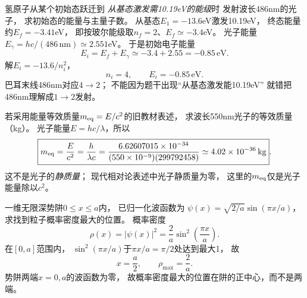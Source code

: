 \problemtext 氢原子从某个初始态跃迁到
\emph{从基态激发需10.19eV的能级}时
发射波长486nm的光子，
求初始态的能量与主量子数。
\workings
从基态$E_1=-13.6$eV激发10.19eV，
终态能量约$E_f=-3.41$eV，
即按玻尔能级取$n_f=2$、$E_f\simeq-3.4$eV。
光子能量
$E_\gamma=hc/(486\,\mathrm{nm})\simeq2.551$eV。
于是初始电子能量
\[
E_i=E_f+E_\gamma\simeq-3.4+2.55
=-0.85\,\mathrm{eV}.
\]
解$E_i=-13.6/n_i^2$，
\[
\boxed{n_i=4},\qquad
\boxed{E_i=-0.85\,\mathrm{eV}}.
\]
\crosscheck 巴耳末线486nm对应$4\to2$；
不能因为题干出现“从基态激发能10.19eV”
就错把486nm理解成$1\to2$发射。

\problemtext 若采用能量等效质量$m_{\rm eq}=E/c^2$的旧教材表述，
求波长550nm光子的等效质量（kg）。
\workings
光子能量$E=hc/\lambda$，所以
\[
\boxed{m_{\rm eq}=\frac{E}{c^2}
=\frac{h}{\lambda c}
=\frac{6.62607015\times10^{-34}}
{(550\times10^{-9})(299792458)}
\simeq4.02\times10^{-36}\,\mathrm{kg}}.
\]
\crosscheck 这不是光子的\emph{静质量}；
现代相对论表述中光子静质量为零，
这里的$m_{\rm eq}$仅是光子能量除以$c^2$。

\problemtext 一维无限深势阱$0\le x\le a$内，
已归一化波函数为
$\psi(x)=\sqrt{2/a}\sin(\pi x/a)$，
求找到粒子概率密度最大的位置。
\workings
概率密度
\[
\rho(x)=|\psi(x)|^2
=\frac2a\sin^2\left(\frac{\pi x}{a}\right).
\]
在$[0,a]$范围内，
$\sin^2(\pi x/a)$于$\pi x/a=\pi/2$处达到最大1，
故
\[
\boxed{x=\frac a2},\qquad
\boxed{\rho_{\max}=\frac2a}.
\]
\crosscheck 势阱两端$x=0,a$的波函数为零，
故概率密度最大的位置在阱的正中心，而不是两端。

